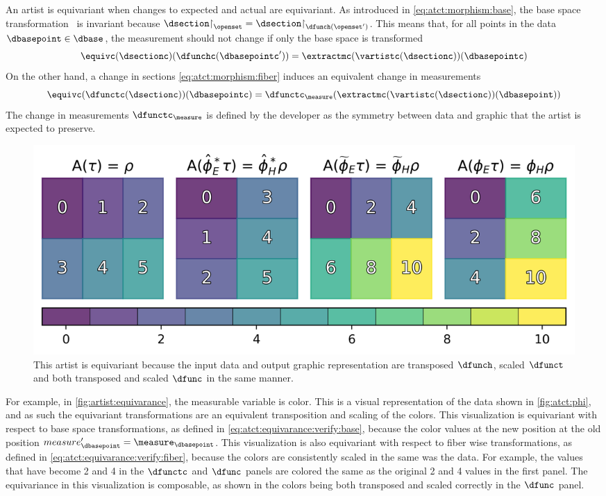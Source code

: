 \documentclass[10pt,journal,compsoc]{IEEEtran}
\renewcommand{\restriction}{\mathord{\upharpoonright}} %
\theoremstyle{definition}
\theoremstyle{remark}
\begin{document}
An artist is equivariant when changes to expected and actual are equivariant. As introduced in \autoref{eq:atct:morphism:base}, the base space transformation \dfunch\ is invariant because $\dsection\restriction_{\openset} = \dsection\restriction_{\dfunch(\openset^{\prime})}$. This means that, for all points in the data $\dbasepoint \in \dbase$, the measurement should not change if only the base space is transformed 
\begin{equation}
  \label{eq:atct:equivarance:verify:base}
  \equivc(\dsectionc)(\dfunchc(\dbasepointc^{\prime})) = \extractmc(\vartistc(\dsectionc))(\dbasepointc)
\end{equation}
On the other hand, a change in sections \autoref{eq:atct:morphism:fiber} induces an equivalent change in measurements
\begin{equation}
  \label{eq:atct:equivarance:verify:fiber}
  \equivc(\dfunctc(\dsectionc))(\dbasepointc) = \dfunctc_{\measure}(\extractmc(\vartistc(\dsectionc))(\dbasepoint))
\end{equation}
The change in measurements $\dfunctc_{\measure}$ is defined by the developer as the symmetry between data and graphic that the artist is expected to preserve. 

\begin{figure}[h!]
  \includegraphics[width=1\columnwidth]{equivariance.png}
  \caption{This artist is equivariant because the input data and output graphic representation are transposed $\dfunch$, scaled $\dfunct$ and both transposed and scaled $\dfunc$ in the same manner. \label{fig:artist:equivariance}}
\end{figure}
For example, in \autoref{fig:artist:equivarance}, the measurable variable is color. This is a visual representation of the data shown in \autoref{fig:atct:phi}, and as such the equivariant transformations are an equivalent transposition and scaling of the colors. This visualization is equivariant with respect to base space transformations, as defined in \autoref{eq:atct:equivarance:verify:base}, because the color values at the new position at the old position $measure_\dbasepoint^{\prime} = \measure_{\dbasepoint}$. This visualization is also equivariant with respect to fiber wise transformations, as defined in \autoref{eq:atct:equivarance:verify:fiber}, because the colors are consistently scaled in the same was the data. For example, the values that have become 2 and 4 in the $\dfunctc$ and $\dfunc$ panels are colored the same as the original 2 and 4 values in the first panel. The equivariance in this visualization is composable, as shown in the colors being both transposed and scaled correctly in the $\dfunc$ panel.
\end{document}
